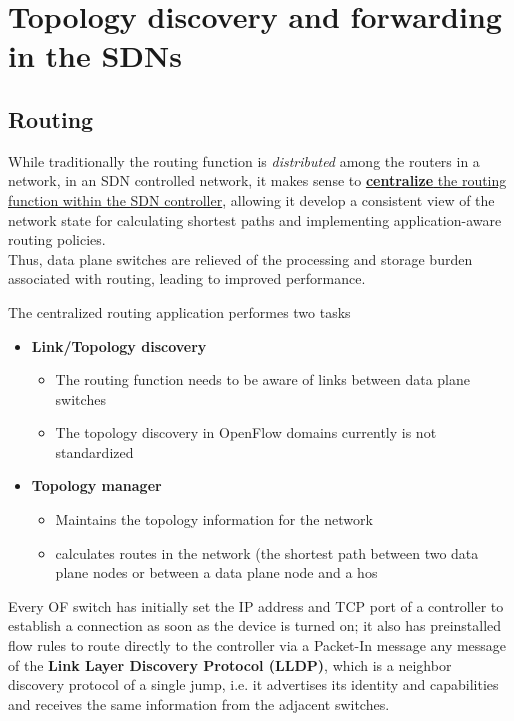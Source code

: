 \section{Topology discovery and forwarding in the SDNs}
\subsection{Routing}
While traditionally the routing function is \textit{distributed} among the routers in a network, in an SDN controlled network, it makes sense to \ul{\textbf{centralize} the routing function within the SDN controller}, allowing it develop a consistent view of the network state for calculating shortest paths and implementing application-aware routing policies.\\
Thus, data plane switches are relieved of the processing and storage burden associated with routing, leading to improved performance.

The centralized routing application performes two tasks
\begin{itemize}
   \item \textbf{Link/Topology discovery}
   \begin{itemize}
      \item The routing function needs to be aware of links between data plane switches
      \item The topology discovery in OpenFlow domains currently is not standardized
   \end{itemize}
   \item \textbf{Topology manager}
   \begin{itemize}
      \item Maintains the topology information for the network
      \item calculates routes in the network (the shortest path between two data plane
      nodes or between a data plane node and a hos
   \end{itemize}
\end{itemize}

Every OF switch has initially set the IP address and TCP port of a controller to establish a connection as soon as the device is turned on; it also has preinstalled flow rules to route directly to the controller via a Packet-In message any message of the \textbf{Link Layer Discovery Protocol (LLDP)}, which is a neighbor discovery protocol of a single jump, i.e. it advertises its identity and capabilities and receives the same information from the adjacent switches.

